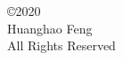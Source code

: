 \newpage
\thispagestyle{empty}
\vspace*{7.5in}
\begin{center}
\copyright 2020\\
\vspace{0.1in}
Huanghao Feng\\
\vspace{0.1in}
All Rights Reserved\\
\end{center}
